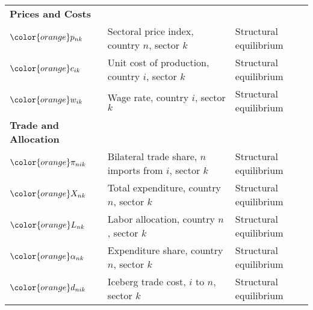 \begin{table}[H]
{\begin{tabular}{>{\raggedright}p{3.5cm} >{\raggedright}p{7cm} >{\raggedright\arraybackslash}p{4.5cm}}
\midrule
\multicolumn{3}{l}{\textbf{\large Endogenous Variables}} \\
\midrule
\textbf{Prices and Costs} & & \\
${\color{orange}p_{nk}}$ & Sectoral price index, country $n$, sector $k$ & Structural equilibrium \\
${\color{orange}c_{ik}}$ & Unit cost of production, country $i$, sector $k$ & Structural equilibrium \\
${\color{orange}w_{ik}}$ & Wage rate, country $i$, sector $k$ & Structural equilibrium \\
\addlinespace[0.2em]
\textbf{Trade and Allocation} & & \\
${\color{orange}\pi_{nik}}$ & Bilateral trade share, $n$ imports from $i$, sector $k$ & Structural equilibrium \\
${\color{orange}X_{nk}}$ & Total expenditure, country $n$, sector $k$ & Structural equilibrium \\
${\color{orange}L_{nk}}$ & Labor allocation, country $n$, sector $k$ & Structural equilibrium \\
${\color{orange}\alpha_{nk}}$ & Expenditure share, country $n$, sector $k$ & Structural equilibrium \\
${\color{orange}d_{nik}}$ & Iceberg trade cost, $i$ to $n$, sector $k$ & Structural equilibrium \\
\bottomrule
\end{tabular}%
}
\end{table}
